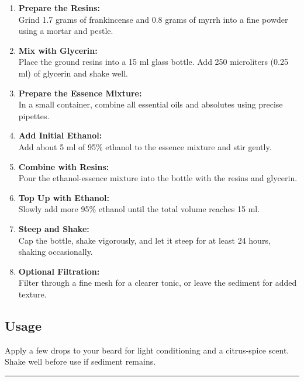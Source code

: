 \documentclass{article}
\begin{document}
\begin{enumerate}[leftmargin=*]
\item \textbf{Prepare the Resins:}\\
   Grind 1.7 grams of frankincense and 0.8 grams of myrrh into a fine powder using a mortar and pestle.

\item \textbf{Mix with Glycerin:}\\
   Place the ground resins into a 15 ml glass bottle. Add 250 microliters (0.25 ml) of glycerin and shake well.

\item \textbf{Prepare the Essence Mixture:}\\
   In a small container, combine all essential oils and absolutes using precise pipettes.

\item \textbf{Add Initial Ethanol:}\\
   Add about 5 ml of 95\% ethanol to the essence mixture and stir gently.

\item \textbf{Combine with Resins:}\\
   Pour the ethanol-essence mixture into the bottle with the resins and glycerin.

\item \textbf{Top Up with Ethanol:}\\
   Slowly add more 95\% ethanol until the total volume reaches 15 ml.

\item \textbf{Steep and Shake:}\\
   Cap the bottle, shake vigorously, and let it steep for at least 24 hours, shaking occasionally.

\item \textbf{Optional Filtration:}\\
   Filter through a fine mesh for a clearer tonic, or leave the sediment for added texture.
\end{enumerate}

\subsection*{Usage}
Apply a few drops to your beard for light conditioning and a citrus-spice scent. Shake well before use if sediment remains.

\vspace{1em}
\hrule
\vspace{1em}
\end{document}
